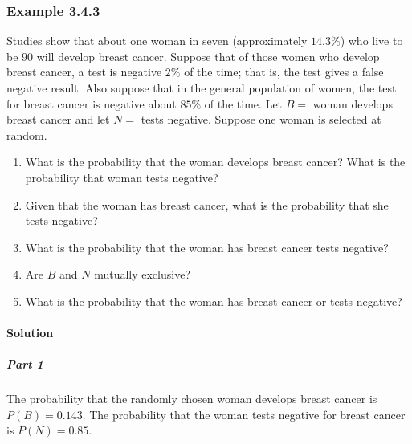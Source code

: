 \documentclass[letterpaper,10pt,english]{jupyterBook}
\begin{document}
\subsubsection{Example 3.4.3}
\label{\detokenize{Ch3 Probability/3.4 Addition Rules and Mutually Exclusive Events:example-3-4-3}}
\sphinxAtStartPar
Studies show that about one woman in seven (approximately \(14.3\%\)) who live to be \(90\) will develop breast cancer. Suppose that of those women who develop breast cancer, a test is negative \(2\%\) of the time; that is, the test gives a false negative result. Also suppose that in the general population of women, the test for breast cancer is negative about \(85\%\) of the time. Let \(B =\) woman develops breast cancer and let \(N =\) tests negative. Suppose one woman is selected at random.
\begin{enumerate}
%
\item {} 
\sphinxAtStartPar
What is the probability that the woman develops breast cancer? What is the probability that woman tests negative?

\item {} 
\sphinxAtStartPar
Given that the woman has breast cancer, what is the probability that she tests negative?

\item {} 
\sphinxAtStartPar
What is the probability that the woman has breast cancer  tests negative?

\item {} 
\sphinxAtStartPar
Are \(B\) and \(N\) mutually exclusive?

\item {} 
\sphinxAtStartPar
What is the probability that the woman has breast cancer or tests negative?

\end{enumerate}


\paragraph{Solution}
\label{\detokenize{Ch3 Probability/3.4 Addition Rules and Mutually Exclusive Events:id4}}

\subparagraph{Part 1}
\label{\detokenize{Ch3 Probability/3.4 Addition Rules and Mutually Exclusive Events:id5}}
\sphinxAtStartPar
The probability that the randomly chosen woman develops breast cancer is \(P(B) = 0.143\). The probability that the woman tests negative for breast cancer is \(P(N) = 0.85\).
\end{document}
